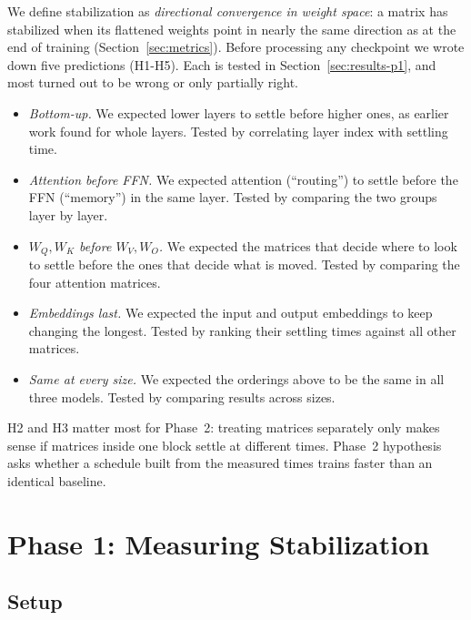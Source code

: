 \documentclass[11pt]{article}
\newcommand{\Wq}{W_Q}
\newcommand{\Wk}{W_K}
\newcommand{\Wv}{W_V}
\newcommand{\Wo}{W_O}
\begin{document}
We define stabilization as \emph{directional convergence in weight space}: a
matrix has stabilized when its flattened weights point in nearly the same
direction as at the end of training (Section~\ref{sec:metrics}). Before
processing any checkpoint we wrote down five predictions (H1-H5). Each is tested in
Section~\ref{sec:results-p1}, and most turned out to be wrong or only partially
right.

\begin{itemize}\itemsep0pt \parskip0pt
\item[\textbf{H1}] \emph{Bottom-up.} We expected lower layers to settle
  before higher ones, as earlier work found for whole layers. Tested by
  correlating layer index with settling time.
\item[\textbf{H2}] \emph{Attention before FFN.} We expected attention
  (``routing'') to settle before the FFN (``memory'') in the same layer.
  Tested by comparing the two groups layer by layer.
\item[\textbf{H3}] \emph{$\Wq,\Wk$ before $\Wv,\Wo$.} We expected the
  matrices that decide where to look to settle before the ones that decide
  what is moved. Tested by comparing the four attention matrices.
\item[\textbf{H4}] \emph{Embeddings last.} We expected the input and output
  embeddings to keep changing the longest. Tested by ranking their settling
  times against all other matrices.
\item[\textbf{H5}] \emph{Same at every size.} We expected the orderings above
  to be the same in all three models. Tested by comparing results across sizes.
\end{itemize}

\noindent H2 and H3 matter most for Phase~2: treating matrices separately only
makes sense if matrices inside one block settle at different times. 
Phase~2 hypothesis asks whether a schedule built from the measured times
trains faster than an identical baseline.

\section{Phase 1: Measuring Stabilization}

\subsection{Setup}
\end{document}
